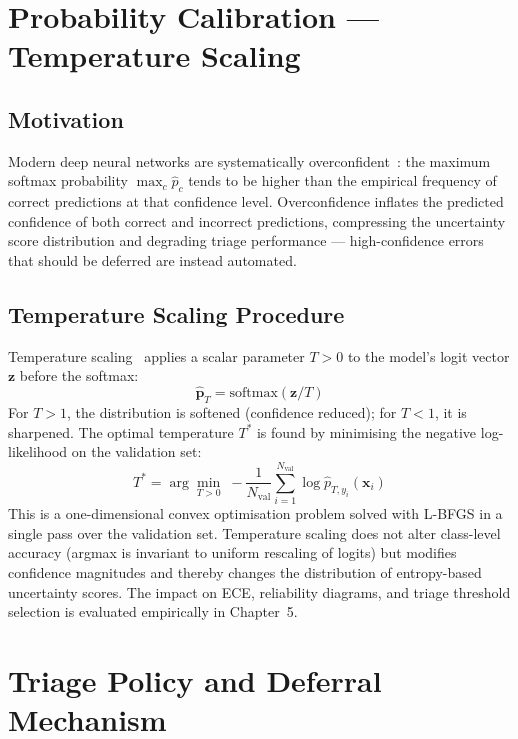 \section{Probability Calibration — Temperature Scaling}

\subsection{Motivation}

Modern deep neural networks are systematically overconfident~\cite{guo2017calibration}: the maximum softmax probability $\max_c \hat{p}_c$ tends to be higher than the empirical frequency of correct predictions at that confidence level. Overconfidence inflates the predicted confidence of both correct and incorrect predictions, compressing the uncertainty score distribution and degrading triage performance — high-confidence errors that should be deferred are instead automated.

\subsection{Temperature Scaling Procedure}

Temperature scaling~\cite{guo2017calibration} applies a scalar parameter $T > 0$ to the model's logit vector $\mathbf{z}$ before the softmax:
\begin{equation}
    \hat{\mathbf{p}}_T = \text{softmax}(\mathbf{z} / T)
\end{equation}
For $T > 1$, the distribution is softened (confidence reduced); for $T < 1$, it is sharpened. The optimal temperature $T^*$ is found by minimising the negative log-likelihood on the validation set:
\begin{equation}
    T^* = \arg\min_{T > 0} \; -\frac{1}{N_{\text{val}}} \sum_{i=1}^{N_{\text{val}}} \log \hat{p}_{T,y_i}(\mathbf{x}_i)
\end{equation}
This is a one-dimensional convex optimisation problem solved with L-BFGS in a single pass over the validation set. Temperature scaling does not alter class-level accuracy (argmax is invariant to uniform rescaling of logits) but modifies confidence magnitudes and thereby changes the distribution of entropy-based uncertainty scores. The impact on ECE, reliability diagrams, and triage threshold selection is evaluated empirically in Chapter~5.

\section{Triage Policy and Deferral Mechanism}

